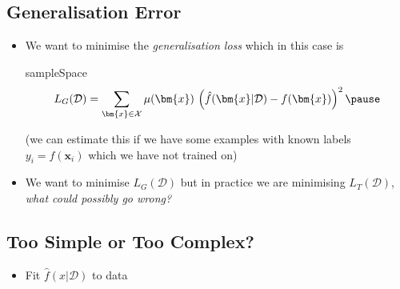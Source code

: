 
\begin{slide}
\section{Generalisation Error}

\begin{PauseHighLight}
  \begin{itemize}
  \item We want to minimise the \textit{generalisation loss} which in
    this case is
    
    \begin{rightImage}{sampleSpace}
      \begin{align*}
        L_G(\mathcal{D}) = \sum_{\bm{x}\in\mathcal{X}} \mu(\bm{x})\,
        \left(\hat{f}(\bm{x}\vert \mathcal{D}) - f(\bm{x})
        \right)^2\pause 
      \end{align*}
    \end{rightImage}

    (we can estimate this if we have some examples with known labels
    $y_i=f(\bm{x}_i)$ which we have not trained on)\pause
  \item We want to minimise $L_G(\mathcal{D})$ but in practice we are
    minimising $L_T(\mathcal{D})$, \textit{what could possibly go wrong?}\pause
  \end{itemize}
\end{PauseHighLight}

\end{slide}


\begin{slide}
\section[-2]{Too Simple or Too Complex?}

\pb
\hypertarget{regression}{}

\begin{itemize}
\item Fit $\hat{f}(x|\mathcal{D})$ to data\pauseh
  \begin{center}
    \pause
  \end{center}
\end{itemize}

\end{slide}


